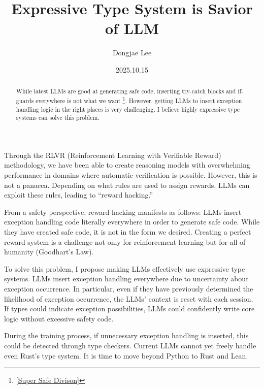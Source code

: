 \documentclass[11pt, oneside]{article}   	%
\title{Expressive Type System is Savior of LLM}
\author{Dongjae Lee}
\date{2025.10.15}
\begin{document}
\maketitle


\begin{abstract}
	While latest LLMs are good at generating safe code, inserting try-catch blocks and if-guards everywhere is not what we want \footnote{[\href{https://x.com/karpathy/status/1976082963382272334/photo/1}{Super Safe Divison}]}.
	However, getting LLMs to insert exception handling logic in the right places is very challenging.
	I believe highly expressive type systems can solve this problem.
\end{abstract}

Through the RLVR (Reinforcement Learning with Verifiable Reward) methodology,
we have been able to create reasoning models with overwhelming performance in domains where automatic verification is possible.
However, this is not a panacea.
Depending on what rules are used to assign rewards, LLMs can exploit these rules, leading to ``reward hacking.''

From a safety perspective, reward hacking manifests as follows: LLMs insert exception handling code literally everywhere in order to generate safe code.
While they have created safe code, it is not in the form we desired.
Creating a perfect reward system is a challenge not only for reinforcement learning but for all of humanity (Goodhart's Law).

To solve this problem, I propose making LLMs effectively use expressive type systems.
LLMs insert exception handling everywhere due to uncertainty about exception occurrence.
In particular, even if they have previously determined the likelihood of exception occurrence, the LLMs' context is reset with each session.
If types could indicate exception possibilities, LLMs could confidently write core logic without excessive safety code.

During the training process, if unnecessary exception handling is inserted, this could be detected through type checkers.
Current LLMs cannot yet freely handle even Rust's type system.
It is time to move beyond Python to Rust and Lean.
\end{document}
